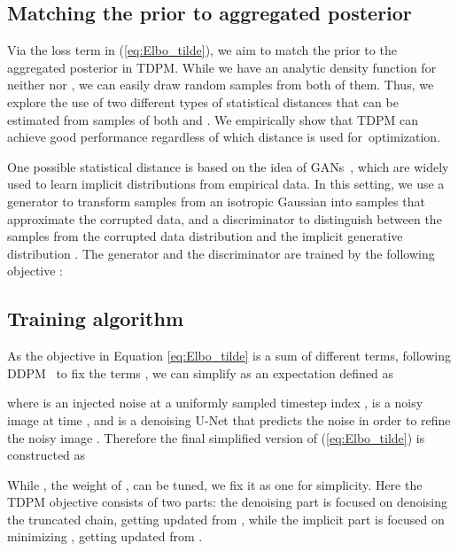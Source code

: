 \documentclass{article} \usepackage{iclr2023_conference,times}
\newcommand{\ba}[1]{}
\def\Eqref#1{(\ref{#1})}
\def\rvx{{\mathbf{x}}}
\def\rvz{{\mathbf{z}}}
\def\gL{{\mathcal{L}}}
\newcommand{\E}{\mathbb{E}}
\theoremstyle{plain}
\theoremstyle{definition}
\theoremstyle{remark}
\begin{document}
{\subsection{Matching the prior to aggregated posterior}
Via the loss term  in \Eqref{eq:Elbo_tilde}, we aim to match the prior  to the aggregated posterior  in TDPM. While we have an analytic density function for neither  nor , we can easily draw random samples from both of them. Thus, we explore the use of two different types of statistical distances that can be estimated from samples of both  and .
We empirically show that TDPM can achieve good performance regardless of which distance is used for~optimization.




One possible statistical distance is based on the idea of GANs~\citep{goodfellow2014generative,arjovsky2017wasserstein,binkowski2018demystifying}, which are widely used to learn implicit distributions from empirical data. In this setting, we use a generator  to transform samples from an isotropic Gaussian  into samples that approximate the corrupted data, and a discriminator  to distinguish between the samples from the corrupted data distribution  and the implicit generative distribution . The generator and the discriminator are trained by the following objective :
\ba{
\min_\psi \max_\phi~~~ &\E_{\rvx \sim q(\rvx_{T_\text{trunc}})}\! \left[\log D_\phi(\rvx) \right]  + \E_{\rvz \sim p(\rvz)} \left[ \log (1\!-\! D_\phi(G_\psi(\rvz))) \right]\!. \label{eq:gan_training}
}

\subsection{Training algorithm}
As the objective in Equation \ref{eq:Elbo_tilde}  is a sum of different terms, following
DDPM~\citep{ddpm} to fix the terms , we can simplify  as an expectation defined as

where   is an injected noise at a uniformly sampled timestep index ,  is a noisy image at time ,  and  is a denoising U-Net that predicts the noise in order to refine the noisy image .   Therefore the final simplified version of \Eqref{eq:Elbo_tilde} is constructed as 
\ba{
&\gL_{\text{TDPM}}^\text{GAN} = \gL_{\text{simple\_trunc}} + 
\lambda \gL_{T_\text{trunc}}^\text{GAN} 
\label{eq:diffusion_gan_obj}, 
.
}
While , the weight of , can be tuned, we fix it as one for simplicity. 
Here the TDPM objective consists of two parts: the denoising part  is focused on denoising the truncated chain, getting updated from , while the implicit part  is focused on minimizing , {getting updated from }. 


}
\end{document}
